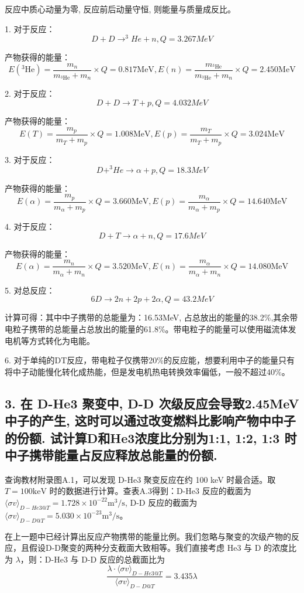\documentclass{article}
\begin{document}
反应中质心动量为零, 反应前后动量守恒, 则能量与质量成反比。

1. 对于反应：$$D+D \rightarrow ^3He + n, Q = 3.267 MeV$$

产物获得的能量：$$E(^{3}\text{He}) = \frac{m_n}{m_{^{3}\text{He}}+m_{n}} \times Q = 0.817 \text{MeV}, E(n) = \frac{m_{^{3}\text{He}}}{m_{^{3}\text{He}}+m_{n}} \times Q = 2.450 \text{MeV}$$

2. 对于反应：$$D+D \rightarrow T + p, Q = 4.032 MeV$$

产物获得的能量：$$E(T) = \frac{m_p}{m_T+m_p} \times Q = 1.008 \text{MeV}, E(p) = \frac{m_T}{m_T+m_p} \times Q = 3.024 \text{MeV}$$

3. 对于反应：$$D+^3He \rightarrow \alpha + p, Q = 18.3 MeV$$

产物获得的能量：$$E(\alpha) = \frac{m_p}{m_{\alpha}+m_p} \times Q = 3.660 \text{MeV}, E(p) = \frac{m_{\alpha}}{m_{\alpha}+m_p} \times Q = 14.640 \text{MeV}$$

4. 对于反应：$$D+T \rightarrow \alpha + n, Q = 17.6 MeV$$

产物获得的能量：$$E(\alpha) = \frac{m_n}{m_{\alpha}+m_n} \times Q = 3.520 \text{MeV}, E(n) = \frac{m_{\alpha}}{m_{\alpha}+m_n} \times Q = 14.080 \text{MeV}$$

5. 对总反应：$$6D \rightarrow 2n + 2p + 2\alpha, Q = 43.2 MeV$$

计算可得：其中中子携带的总能量为：16.53MeV, 占总放出的能量的38.2\%,其余带电粒子携带的总能量占总放出的能量的61.8\%。带电粒子的能量可以使用磁流体发电机等方式转化为电能。

6. 对于单纯的DT反应，带电粒子仅携带20\%的反应能，想要利用中子的能量只有将中子动能慢化转化成热能，但是发电机热电转换效率偏低，一般不超过40\%。

\subsection*{3. 在 D-He3 聚变中, D-D 次级反应会导致2.45MeV中子的产生, 这时可以通过改变燃料比影响产物中中子的份额. 试计算D和He3浓度比分别为1:1, 1:2, 1:3 时中子携带能量占反应释放总能量的份额. }

查询教材附录图A.1，可以发现 D-He3 聚变反应在约 100 keV 时最合适。取 $T = 100 \text{keV}$ 时的数据进行计算。查表A.3得到：D-He3 反应的截面为 $\langle \sigma v\rangle_{D-He3@T} = 1.728 \times {10}^{-22} \text{m}^3/\text{s}$, D-D 反应的截面为 $\langle \sigma v\rangle_{D-D@T} = 5.030 \times {10}^{-23} \text{m}^3/\text{s}$。

在上一题中已经计算出反应产物携带的能量比例。我们忽略与聚变的次级产物的反应，且假设D-D聚变的两种分支截面大致相等。我们直接考虑 He3 与 D 的浓度比为 $\lambda$，则：D-He3 与 D-D 反应的总截面比为 $$\frac{\lambda \cdot \langle \sigma v\rangle_{D-He3@T}}{\langle \sigma v\rangle_{D-D@T}} = 3.435\lambda$$
\end{document}
